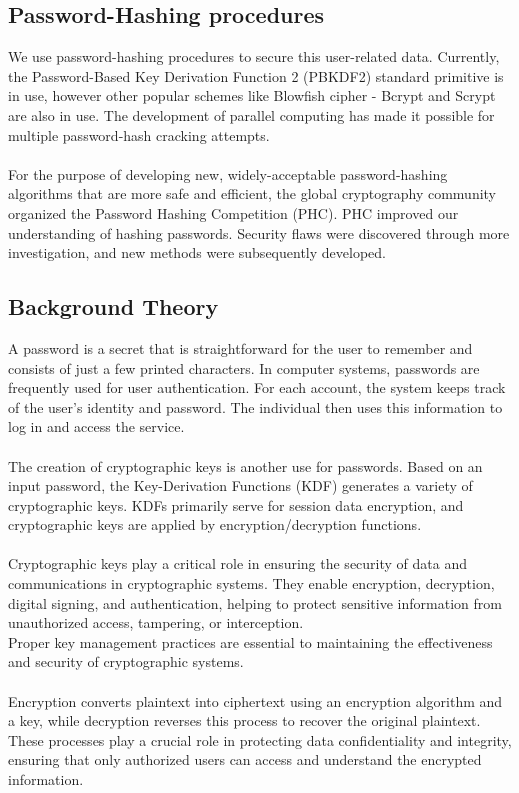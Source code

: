 \documentclass[10pt,oneside,english,a4paper]{article}
\begin{document}
\subsection{Password-Hashing procedures}
We use password-hashing procedures to secure this user-related data.
Currently, the Password-Based Key Derivation Function 2 (PBKDF2) standard primitive is in use, however other popular schemes like Blowfish cipher - Bcrypt and Scrypt are also in use.
The development of parallel computing has made it possible for multiple password-hash cracking attempts.
\\\\
For the purpose of developing new, widely-acceptable password-hashing algorithms that are more safe and efficient, the global cryptography community organized the Password Hashing Competition (PHC). PHC improved our understanding of hashing passwords. Security flaws were discovered through more investigation, and new methods were subsequently developed.

\subsection{Background Theory}
A password is a secret that is straightforward for the user to remember and consists of just a few printed characters. In computer systems, passwords are frequently used for user authentication. For each account, the system keeps track of the user's identity and password. The individual then uses this information to log in and access the service.
\\\\
The creation of cryptographic keys is another use for passwords. Based on an input password, the Key-Derivation Functions (KDF) generates a variety of cryptographic keys. KDFs primarily serve for session data encryption, and cryptographic keys are applied by encryption/decryption functions.
\\\\
Cryptographic keys play a critical role in ensuring the security of data and communications in cryptographic systems. They enable encryption, decryption, digital signing, and authentication, helping to protect sensitive information from unauthorized access, tampering, or interception. \\
Proper key management practices are essential to maintaining the effectiveness and security of cryptographic systems.
\\\\
Encryption converts plaintext into ciphertext using an encryption algorithm and a key, while decryption reverses this process to recover the original plaintext. 
These processes play a crucial role in protecting data confidentiality and integrity, ensuring that only authorized users can access and understand the encrypted information.
\end{document}

